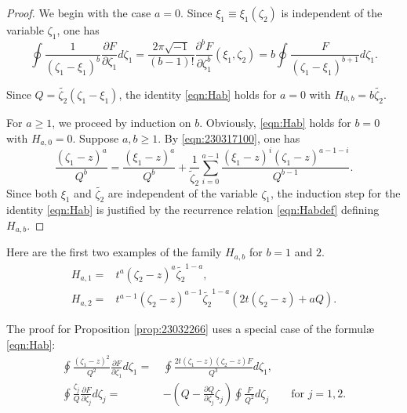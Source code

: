 \documentclass[12pt,leqno]{amsart}
\theoremstyle{plain}
\theoremstyle{definition}
\begin{document}
\begin{proof}
We begin with the case $a=0$.  
Since $\xi_1 \equiv \xi_1(\zeta_2)$ is independent 
 of the variable $\zeta_1$, 
 one has 
\[
 \oint \frac{1}{(\zeta_1-\xi_1)^b} 
\frac{\partial F} {\partial \zeta_1} d \zeta_1
= \frac {2\pi \sqrt{-1}} {(b-1)!} \frac{\partial^b F} {\partial \zeta_1^b} (\xi_1, \zeta_2)
=b \oint \frac F {(\zeta_1-\xi_1)^{b+1}} d \zeta_1.  
\]



Since $Q=\widetilde{\zeta_2}(\zeta_1-\xi_1)$, 
 the identity \eqref{eqn:Hab} holds for $a=0$ with 
$
H_{0,b}=b \widetilde{\zeta_2}.  
$



For $a \ge 1$, 
 we proceed by induction on $b$.  
Obviously, 
 \eqref{eqn:Hab} holds
 for $b=0$
 with $H_{a,0}=0$.  
Suppose $a, b \ge 1$.  
By \eqref{eqn:230317100}, 
 one has
\[
  \frac{(\zeta_1-z)^a}{Q^b}
  =
  \frac{(\xi_1-z)^a}{Q^b}
 +\frac1 {\widetilde \zeta_2}
  \sum_{i=0}^{a-1}\frac{(\xi_1-z)^i (\zeta_1-z)^{a-1-i}}{Q^{b-1}}.  
\]
Since both $\xi_1$ and $\widetilde{\zeta_2}$ are independent
 of the variable $\zeta_1$, 
 the induction step for the identity \eqref{eqn:Hab} is justified 
 by the recurrence relation \eqref{eqn:Habdef} defining $H_{a,b}$.  
\end{proof}



Here are the first two examples of the family $H_{a,b}$
 for $b=1$ and $2$.  
\begin{align}
H_{a,1}=&t^a(\zeta_2-z)^a\widetilde{\zeta_2}^{1-a}, 
\label{eqn:23032224}
\\
H_{a,2}=&t^{a-1}(\zeta_2-z)^{a-1}\widetilde{\zeta_2}^{1-a}
(2t(\zeta_2-z)+a Q).  
\label{eqn:23032610}
\end{align}



The proof for Proposition \ref{prop:23032266} uses
 a special case of the formul{\ae} \eqref{eqn:Hab}:
\begin{align}
\label{eqn:23032244}
\oint \frac{(\zeta_1-z)^2}{Q^2} \frac{\partial F}{\partial \zeta_1}d \zeta_1
=\,&\oint \frac {2t(\zeta_1-z)(\zeta_2-z)F}{Q^3}d \zeta_1, 
\\
\label{eqn:23031838}
\oint \frac{\zeta_j}{Q} \frac{\partial F}{\partial \zeta_j} d \zeta_j
=\,&
-(Q -\frac{\partial Q}{\partial \zeta_j} \zeta_j)
\oint \frac{F}{Q^{2}} d \zeta_j
\qquad
\text{for $j=1,2$}.  
\end{align}
\end{document}
